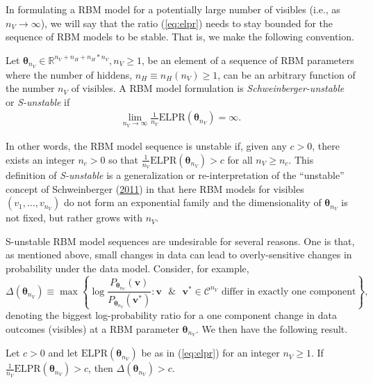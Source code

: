\documentclass[12pt]{article}
\theoremstyle{definition}
\newcommand{\nv}{{n_{\scriptscriptstyle V}}}
\newcommand{\nh}{{n_{\scriptscriptstyle H}}}
\let\BeginKnitrBlock\begin \let\EndKnitrBlock\end
\begin{document}
In formulating a RBM model for a potentially large number of visibles
(i.e., as \(\nv \rightarrow \infty\)), we will say that the ratio
(\eqref{eq:elpr}) needs to stay bounded for the sequence of RBM models to
be stable. That is, we make the following convention.
\BeginKnitrBlock{definition}[S-unstable RBM]
\protect\hypertarget{def:unnamed-chunk-1}{}{\label{def:unnamed-chunk-1}
{} }Let
\(\boldsymbol \theta_\nv \in \mathbb{R}^{\nv + \nh + \nh*\nv}, \nv \ge 1\),
be an element of a sequence of RBM parameters where the number of
hiddens, \(\nh \equiv \nh(\nv) \ge 1\), can be an arbitrary function of
the number \(\nv\) of visibles. A RBM model formulation is
\emph{Schweinberger-unstable} or \emph{S-unstable} if
\begin{align*}
\lim\limits_{\nv \rightarrow \infty} \frac{1}{\nv} \text{ELPR}(\boldsymbol \theta_\nv) = \infty.
\end{align*}
\EndKnitrBlock{definition} In other words, the RBM model sequence is
unstable if, given any \(c > 0\), there exists an integer \(n_c > 0\) so
that \(\frac{1}{\nv}\text{ELPR}(\boldsymbol \theta_\nv) > c\) for all
\(\nv \ge n_c\). This definition of \emph{S-unstable} is a
generalization or re-interpretation of the ``unstable'' concept of
Schweinberger
(\protect\hyperlink{ref-schweinberger2011instability}{2011}) in that
here RBM models for visibles \((v_1, \dots, v_\nv)\) do not form an
exponential family and the dimensionality of \(\boldsymbol \theta_\nv\)
is not fixed, but rather grows with \(\nv\).

S-unstable RBM model sequences are undesirable for several reasons. One
is that, as mentioned above, small changes in data can lead to
overly-sensitive changes in probability under the data model. Consider,
for example, \[
\Delta(\boldsymbol \theta_\nv) \equiv \max \left\{\log \frac{P_{\boldsymbol \theta_\nv}(\boldsymbol v)}{P_{\boldsymbol \theta_\nv}(\boldsymbol v^*)} : \boldsymbol v \text{ }\& \text{ } \boldsymbol v^* \in \mathcal{C}^\nv \text{ differ in exactly one component}\right\},
\] denoting the biggest log-probability ratio for a one component change
in data outcomes (visibles) at a RBM parameter
\(\boldsymbol \theta_\nv\). We then have the following result.

\BeginKnitrBlock{proposition}
\protect\hypertarget{prp:instab1}{}{\label{prp:instab1}}Let \(c > 0\) and
let \(\text{ELPR}(\boldsymbol \theta_\nv)\) be as in (\eqref{eq:elpr}) for
an integer \(\nv \ge 1\). If
\(\frac{1}{\nv}\text{ELPR}(\boldsymbol \theta_\nv) > c\), then
\(\Delta(\boldsymbol \theta_\nv) > c\).
\EndKnitrBlock{proposition}
\end{document}
